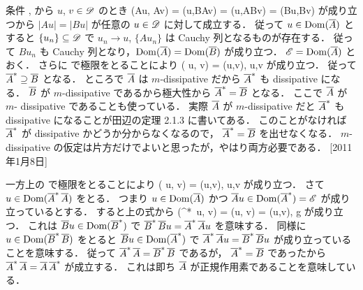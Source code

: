 \Proof
条件 ,  から $u$, $v\in{\mathscr D}$ のとき
\bdn %
(Au, Av)
= (u,BAv)
= (u,ABv)
= (Bu,Bv)
\edn %
が成り立つから $|Au|=|Bu|$ が任意の $u\in{\mathscr D}$ に対して成立する．
従って $u\in\operatorname{Dom}\nolimits(\overline{A})$ とすると $\{u_n\}\subseteq {\mathscr D}$ で $u_n\to u$,
$\{Au_n\}$ は Cauchy 列となるものが存在する．
従って $Bu_n$ も Cauchy 列となり，$\operatorname{Dom}\nolimits(\overline{A})=\operatorname{Dom}\nolimits(\overline{B})$ が成り立つ．
${\mathscr E}=\operatorname{Dom}\nolimits(\overline{A})$ とおく．
さらに  で極限をとることにより
\bdm %
( u, v)
= (u,v), \quad u,v\in \sE
\edm %
が成り立つ．
従って $\overline{A}^* \supseteq \overline{B}$ となる．
ところで $\overline{A}$ は $m$-dissipative だから $\overline{A}^*$ も dissipative
になる．
$\overline{B}$ が $m$-dissipative
であるから極大性から $\overline{A}^* = \overline{B}$ となる．
\hide
ここで $\overline{A}$ が $m$- dissipative であることも使っている．
実際 $\overline{A}$ が $m$-dissipative だと 
$\overline{A}^*$ も dissipative になることが田辺の定理 2.1.3 に書いてある．
このことがなければ $\overline{A}^*$ が dissipative かどうか分からなくなるので，
$\overline{A}^* = \overline{B}$ を出せなくなる．
$m$-dissipative の仮定は片方だけでよいと思ったが，やはり両方必要である．
\hfill [2011年1月8日]
\endhide

一方上の   で極限をとることにより
\bdm %
( u, v)
= (u,v), \quad u,v\in \sE
\edm %
が成り立つ．
さて $u\in\operatorname{Dom}\nolimits(\overline{A}^*\, \overline{A})$ をとる．
つまり $u\in \operatorname{Dom}\nolimits(\overline{A})$ かつ $\overline{A}u\in\operatorname{Dom}\nolimits(\overline{A}^*)={\mathscr E}$
が成り立っているとする．
すると上の式から
\bdm %
(^*\,  u, v)
= (u, v)
= (u,v), \quad g\in \sE
\edm %
が成り立つ．
これは $\overline{B}u\in \operatorname{Dom}\nolimits(\overline{B}^*)$ で
 $\overline{B}^*\,\overline{B}u=\overline{A}^*\, \overline{A}u$ を意味する．
同様に $u\in\operatorname{Dom}\nolimits(\overline{B}^*\, \overline{B})$ をとると $\overline{B}u\in \operatorname{Dom}\nolimits(\overline{A}^*)$
で  $\overline{A}^*\,\overline{A}u=\overline{B}^* \,\overline{B}u$ が成り立っていることを意味する．
従って $\overline{A}^*\,\overline{A} = \overline{B}^*\, \overline{B}$ であるが，
$\overline{A}^*=\overline{B}$ であったから $\overline{A}^* \,\overline{A} = \overline{A}\, \overline{A}^*$
が成立する．
これは即ち $\overline{A}$ が正規作用素であることを意味している．
\QED %

